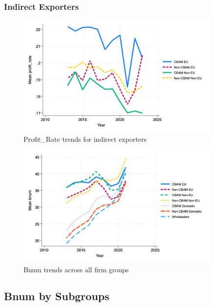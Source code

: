 \documentclass{article}
\begin{document}
\subsubsection{Indirect Exporters}
\begin{figure}[h!]
\centering
\includegraphics[width=0.9\textwidth]{profit_rate_indir.png}
\caption{Profit_Rate trends for indirect exporters}
\label{fig:profit_rate_indir}
\end{figure}

\begin{figure}[h!]
\centering
\includegraphics[width=0.9\textwidth]{bnum_main_groups.png}
\caption{Bnum trends across all firm groups}
\label{fig:bnum_main}
\end{figure}

\subsection{Bnum by Subgroups}
\end{document}
